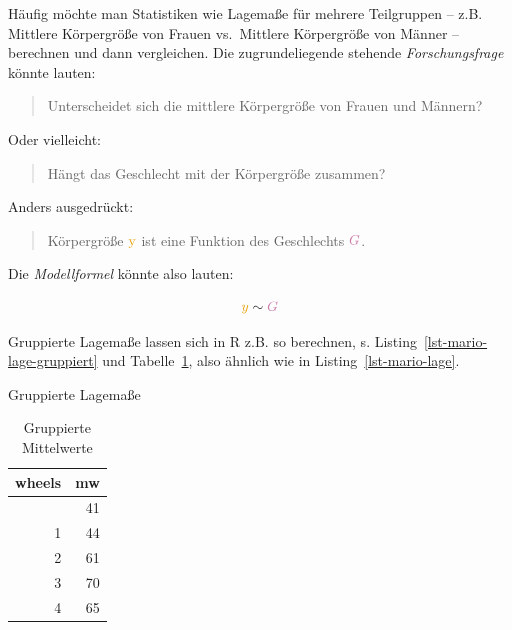 \documentclass[
  letterpaper,
  oneside,
  open=any]{scrbook}
\newenvironment{Shaded}{\begin{snugshade}}{\end{snugshade}}
\newcommand{\AttributeTok}[1]{\textcolor[rgb]{0.40,0.45,0.13}{#1}}
\newcommand{\CommentTok}[1]{\textcolor[rgb]{0.37,0.37,0.37}{#1}}
\newcommand{\FunctionTok}[1]{\textcolor[rgb]{0.28,0.35,0.67}{#1}}
\newcommand{\NormalTok}[1]{\textcolor[rgb]{0.00,0.23,0.31}{#1}}
\newcommand{\OtherTok}[1]{\textcolor[rgb]{0.00,0.23,0.31}{#1}}
\newcommand{\SpecialCharTok}[1]{\textcolor[rgb]{0.37,0.37,0.37}{#1}}
\theoremstyle{definition}
\theoremstyle{definition}
\theoremstyle{definition}
\theoremstyle{remark}
\begin{document}
Häufig möchte man Statistiken wie Lagemaße für mehrere Teilgruppen --
z.B. Mittlere Körpergröße von Frauen vs.~Mittlere Körpergröße von Männer
-- berechnen und dann vergleichen. Die zugrundeliegende stehende
\emph{Forschungsfrage} könnte lauten:

\begin{quote}
Unterscheidet sich die mittlere Körpergröße von Frauen und Männern?
\end{quote}

Oder vielleicht:

\begin{quote}
Hängt das Geschlecht mit der Körpergröße zusammen?
\end{quote}

Anders ausgedrückt:

\begin{quote}
Körpergröße \(\color{ycol}{\text{y}}\) ist eine Funktion des Geschlechts
\(\color{xcol}{G}\).
\end{quote}

Die \emph{Modellformel} könnte also lauten:

\[\color{ycol}{y} \; \color{black}{ \sim } \; \color{xcol}{G}\]

Gruppierte Lagemaße lassen sich in R z.B. so berechnen, s.
Listing~\ref{lst-mario-lage-gruppiert} und Tabelle~\ref{tbl-group-mean},
also ähnlich wie in Listing~\ref{lst-mario-lage}.

\begin{codelisting}

\caption{\label{lst-mario-lage-gruppiert}Gruppierte Lagemaße}

\centering{

\begin{Shaded}
\begin{Highlighting}[]
\NormalTok{mariokart\_lagemaße\_gruppiert }\OtherTok{\textless{}{-}}
\NormalTok{  mariokart }\SpecialCharTok{\%\textgreater{}\%} 
  \FunctionTok{group\_by}\NormalTok{(wheels) }\SpecialCharTok{\%\textgreater{}\%}  \CommentTok{\# neue Zeile, der Rest ist gleich!}
  \FunctionTok{summarise}\NormalTok{(}\AttributeTok{mw =} \FunctionTok{mean}\NormalTok{(total\_pr))}
\end{Highlighting}
\end{Shaded}

}

\end{codelisting}%

\begin{longtable}[]{@{}rr@{}}

\caption{\label{tbl-group-mean}Gruppierte Mittelwerte}

\tabularnewline

\toprule\noalign{}
wheels & mw \\
\midrule\noalign{}
\endhead
\bottomrule\noalign{}
\endlastfoot
0 & 41 \\
1 & 44 \\
2 & 61 \\
3 & 70 \\
4 & 65 \\

\end{longtable}
\end{document}
